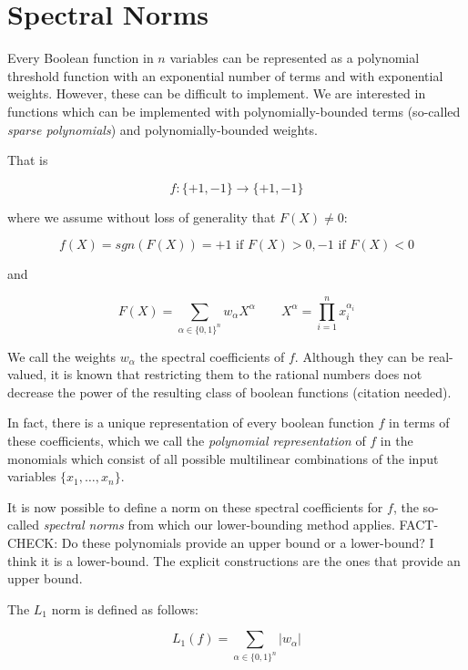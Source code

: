 \documentclass{article}
\begin{document}
\section{Spectral Norms}

Every Boolean function in $n$ variables
can be represented as a polynomial threshold 
function with an exponential number of terms and with
exponential weights. However, these can be difficult to implement.
We are interested in functions which can be implemented with
polynomially-bounded terms (so-called \emph{sparse polynomials})
and polynomially-bounded weights.

That is

\begin{equation}
f:\{+1, -1\} \rightarrow \{+1, -1\}
\end{equation}

where we assume without loss of generality that $F(X) \ne 0$:

\begin{equation}
f(X) = sgn(F(X)) = +1 \text{ if } F(X) > 0, -1 \text{ if } F(X) < 0
\end{equation}

and

\begin{equation}
F(X) = \sum_{\alpha \in \{0,1\}^n} w_{\alpha} X^{\alpha} \qquad
X^{\alpha} = \prod_{i=1}^n x_i^{\alpha_i}
\end{equation}

We call the weights $w_{\alpha}$ the spectral coefficients of $f$.
Although they can be real-valued, it is known that restricting them
to the rational numbers does not decrease the power of the resulting
class of boolean functions (citation needed).

In fact, there is a unique representation of every boolean function $f$
in terms of these coefficients, which we call the
\emph{polynomial representation} of $f$ in the monomials which consist
of all possible multilinear combinations of the input variables
$\{x_1, \ldots, x_n\}$.

It is now possible to define a norm on these spectral coefficients for
$f$, the so-called \emph{spectral norms} from which our lower-bounding
method applies. FACT-CHECK: Do these polynomials provide an upper bound
or a lower-bound? I think it is a lower-bound. The explicit constructions
are the ones that provide an upper bound.

The $L_1$ norm is defined as follows:

\begin{equation}
L_1(f) = \sum_{\alpha\in \{0,1\}^n} |w_{\alpha}|
\end{equation}
\end{document}
